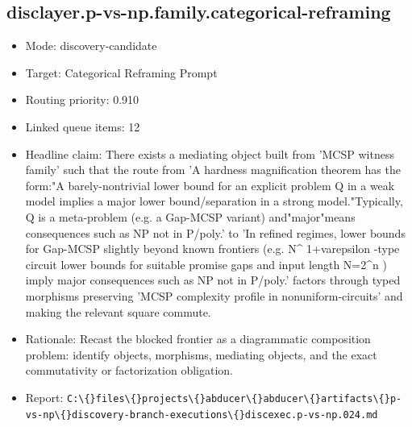 \documentclass[11pt]{article}
\begin{document}
\subsection*{disclayer.p-vs-np.family.categorical-reframing}
\begin{itemize}
\item Mode: discovery-candidate
\item Target: Categorical Reframing Prompt
\item Routing priority: 0.910
\item Linked queue items: 12
\item Headline claim: There exists a mediating object built from 'MCSP witness family' such that the route from 'A hardness magnification theorem has the form:"A barely-nontrivial lower bound for an explicit problem Q in a weak model implies a major lower bound/separation in a strong model."Typically, Q is a meta-problem (e.g. a Gap-MCSP variant) and"major"means consequences such as NP not in P/poly.' to 'In refined regimes, lower bounds for Gap-MCSP slightly beyond known frontiers (e.g. N\textasciicircum{} 1+varepsilon -type circuit lower bounds for suitable promise gaps and input length N=2\textasciicircum{}n ) imply major consequences such as NP not in P/poly.' factors through typed morphisms preserving 'MCSP complexity profile in nonuniform-circuits' and making the relevant square commute.
\item Rationale: Recast the blocked frontier as a diagrammatic composition problem: identify objects, morphisms, mediating objects, and the exact commutativity or factorization obligation.
\item Report: \texttt{C:\textbackslash\{\}files\textbackslash\{\}projects\textbackslash\{\}abducer\textbackslash\{\}abducer\textbackslash\{\}artifacts\textbackslash\{\}p-vs-np\textbackslash\{\}discovery-branch-executions\textbackslash\{\}discexec.p-vs-np.024.md}
\end{itemize}
\end{document}

